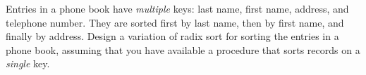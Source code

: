 Entries in a phone book have {\em multiple} keys: last name, first
name, address, and telephone number.  They are sorted first by last
name, then by first name, and finally by address.  Design a variation
of radix sort for sorting the entries in a phone book, assuming that
you have available a procedure that sorts records on a {\em single}
key.
